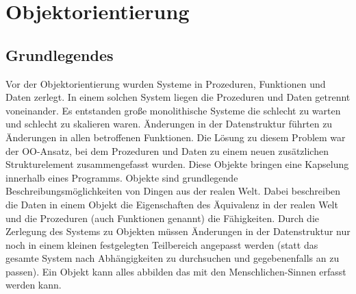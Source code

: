 
\chapter{Objektorientierung}
\section{Grundlegendes}
Vor der Objektorientierung wurden Systeme in Prozeduren, Funktionen und Daten zerlegt. In einem solchen System liegen die Prozeduren und Daten getrennt voneinander. Es entstanden große monolithische Systeme die schlecht zu warten und schlecht zu skalieren waren. Änderungen in der Datenstruktur führten zu Änderungen in allen betroffenen Funktionen. Die Lösung zu diesem Problem war der OO-Ansatz, bei dem Prozeduren und Daten zu einem neuen zusätzlichen Strukturelement zusammengefasst wurden. Diese Objekte bringen eine Kapselung innerhalb eines Programms. Objekte sind grundlegende Beschreibungsmöglichkeiten von Dingen aus der realen Welt. Dabei beschreiben die Daten in einem Objekt die Eigenschaften des Äquivalenz in der realen Welt und die Prozeduren (auch Funktionen genannt) die Fähigkeiten. Durch die Zerlegung des Systems zu Objekten müssen Änderungen in der Datenstruktur nur noch in einem kleinen festgelegten Teilbereich angepasst werden (statt das gesamte System nach Abhängigkeiten zu durchsuchen und gegebenenfalls an zu passen). Ein Objekt kann alles abbilden das mit den Menschlichen-Sinnen erfasst werden kann.

